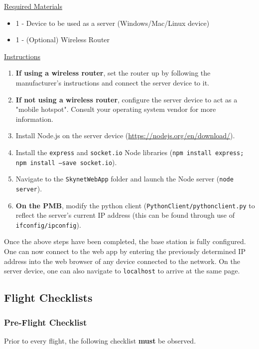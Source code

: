 \documentclass[10pt,letterpaper]{article}
\begin{document}
\underline{Required Materials}
\begin{itemize}
\item 1 - Device to be used as a server (Windows/Mac/Linux device)
\item 1 - (Optional) Wireless Router
\end{itemize}

\underline{Instructions}
\begin{enumerate}
\item \textbf{If using a wireless router}, set the router up by following the manufacturer's instructions and connect the server device to it.
\item \textbf{If not using a wireless router}, configure the server device to act as a "mobile hotspot". Consult your operating system vendor for more information.
\item Install Node.js on the server device (\url{https://nodejs.org/en/download/}).
\item Install the \texttt{express} and \texttt{socket.io} Node libraries (\texttt{npm install express; npm install --save socket.io}).
\item Navigate to the \texttt{SkynetWebApp} folder and launch the Node server (\texttt{node server}). 
\item \textbf{On the PMB}, modify the python client (\texttt{PythonClient/pythonclient.py} to reflect the server's current IP address (this can be found through use of \texttt{ifconfig/ipconfig}).
\end{enumerate}

Once the above steps have been completed, the base station is fully configured. One can now connect to the web app by entering the previously determined IP address into the web browser of any device connected to the network. On the server device, one can also navigate to \texttt{localhost} to arrive at the same page.

\subsection{Flight Checklists}
\subsubsection{Pre-Flight Checklist}
Prior to every flight, the following checklist \textbf{must} be observed.\\
\end{document}
